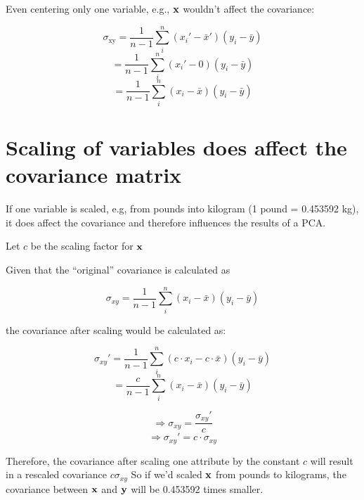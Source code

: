 \documentclass[fleqn]{article}
\begin{document}
Even centering only one variable, e.g., $\bf{x}$ wouldn't affect the covariance:

\begin{equation} \sigma_{\text{xy}} = \frac{1}{n-1} \sum_{i}^{n} (x_i' - \bar{x}')(y_i - \bar{y})   \end{equation}
\begin{equation}  =  \frac{1}{n-1} \sum_{i}^{n} (x_i' - 0)(y_i - \bar{y})   \end{equation}
\begin{equation}  =  \frac{1}{n-1} \sum_{i}^{n} (x_i - \bar{x})(y_i - \bar{y})   \end{equation}



\section{Scaling of variables does affect the covariance matrix}
\label{scalingofvariablesdoesaffectthecovariancematrix}

If one variable is scaled, e.g, from pounds into kilogram (1 pound = 0.453592 kg), it does affect the covariance and therefore influences the results of a PCA.

Let $c$ be the scaling factor for $\bf{x}$

Given that the ``original'' covariance is calculated as

\begin{equation} \sigma_{xy} = \frac{1}{n-1} \sum_{i}^{n} (x_i - \bar{x})(y_i - \bar{y})   \end{equation}

the covariance after scaling would be calculated as:

\begin{equation} \sigma_{xy}' = \frac{1}{n-1} \sum_{i}^{n} (c \cdot x_i - c \cdot  \bar{x})(y_i - \bar{y})   \end{equation}
\begin{equation} =  \frac{c}{n-1} \sum_{i}^{n} (x_i -   \bar{x})(y_i - \bar{y})   \end{equation}

\begin{equation} \Rightarrow \sigma_{xy} = \frac{\sigma_{xy}'}{c} \end{equation}
\begin{equation} \Rightarrow \sigma_{xy}' = c \cdot \sigma_{xy} \end{equation}

Therefore, the covariance after scaling one attribute by the constant $c$ will result in a rescaled covariance $c \sigma_{xy}$ So if we'd scaled $\bf{x}$ from pounds to kilograms, the covariance between $\bf{x}$ and $\bf{y}$ will be 0.453592 times smaller.
\end{document}
